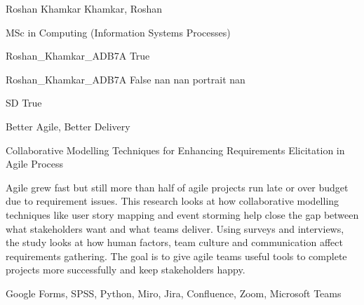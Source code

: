 \documentclass[twoside]{report}
\begin{document}
\begingroup{}\relax



\def\Key{Roshan_Khamkar_ADB7A}

{Roshan Khamkar}
{Khamkar, Roshan}

{MSc in Computing (Information Systems Processes)}

{Roshan_Khamkar_ADB7A}
{True}

{Roshan_Khamkar_ADB7A}
{False}
{nan}
{nan}
{portrait}
{nan}

{SD}
{True}

{Better Agile, Better Delivery}

{Collaborative Modelling Techniques for Enhancing Requirements Elicitation in Agile Process}

{Agile grew fast but still more than half of agile projects run late or over budget due to requirement issues. This research looks at how collaborative modelling techniques like user story mapping and event storming help close the gap between what stakeholders want and what teams deliver. Using surveys and interviews, the study looks at how human factors, team culture and communication affect requirements gathering. The goal is to give agile teams useful tools to complete projects more successfully and keep stakeholders happy.}

{Google Forms, SPSS, Python, Miro, Jira, Confluence, Zoom, Microsoft Teams}
\end{document}

